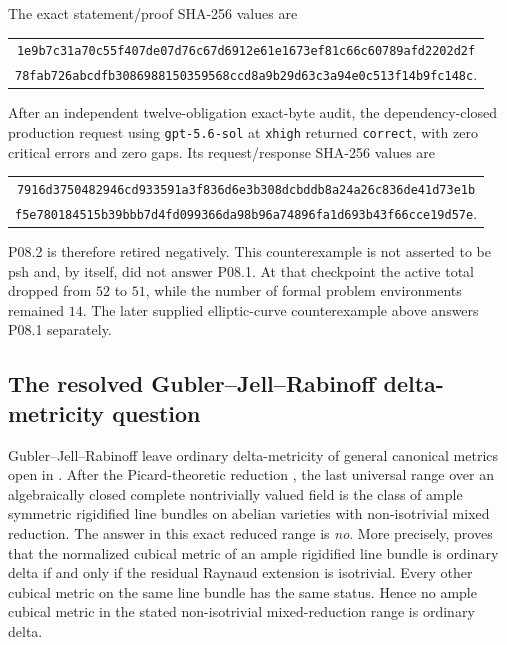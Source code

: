 The exact statement/proof SHA-256 values are
\begin{center}
\small
\begin{tabular}{@{}c@{}}
\nolinkurl{1e9b7c31a70c55f407de07d76c67d6912e61e1673ef81c66c60789afd2202d2f}\\
\nolinkurl{78fab726abcdfb3086988150359568ccd8a9b29d63c3a94e0c513f14b9fc148c}.
\end{tabular}
\end{center}
After an independent twelve-obligation exact-byte audit, the
dependency-closed production request using \texttt{gpt-5.6-sol} at
\texttt{xhigh} returned \texttt{correct}, with zero critical errors and
zero gaps.  Its request/response SHA-256 values are
\begin{center}
\small
\begin{tabular}{@{}c@{}}
\nolinkurl{7916d3750482946cd933591a3f836d6e3b308dcbddb8a24a26c836de41d73e1b}\\
\nolinkurl{f5e780184515b39bbb7d4fd099366da98b96a74896fa1d693b43f66cce19d57e}.
\end{tabular}
\end{center}
P08.2 is therefore retired negatively.  This counterexample is not asserted
to be psh and, by itself, did not answer P08.1.  At that checkpoint the
active total dropped from \(52\) to \(51\), while the number of formal problem
environments remained \(14\).  The later supplied elliptic-curve
counterexample above answers P08.1 separately.

\subsection{The resolved Gubler--Jell--Rabinoff delta-metricity question}
\label{sec:ch72-gjr-resolved}

Gubler--Jell--Rabinoff leave ordinary delta-metricity of general canonical
metrics open in \cite[Remark~16.4]{GJR26}.  After the Picard-theoretic
reduction , the last universal range over an
algebraically closed complete nontrivially valued field is the class of ample
symmetric rigidified line bundles on abelian varieties with non-isotrivial
mixed reduction.  The answer in this exact reduced range is \emph{no}.  More
precisely,
 proves that the normalized cubical
metric of an ample rigidified line bundle is ordinary delta if and only if
the residual Raynaud extension is isotrivial.  Every other cubical metric on
the same line bundle has the same status.  Hence no ample cubical metric in
the stated non-isotrivial mixed-reduction range is ordinary delta.

